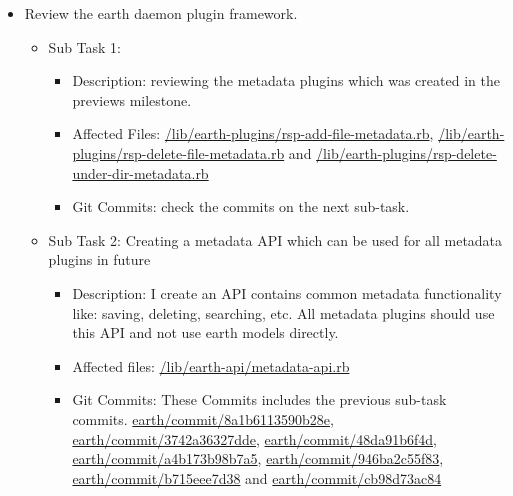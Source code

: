 \documentclass{article}
\begin{document}
\begin{itemize}
	\item Review the earth daemon plugin framework.
		\begin{itemize}
		\item Sub Task 1:
			\begin{itemize}
			\item Description: reviewing the metadata plugins which was created in the previews milestone.
			\item Affected Files: \href{http://github.com/mfbDev/earth/tree/master/lib/earth_plugins/rsp_add_file_metadata.rb}{/lib/earth-plugins/rsp-add-file-metadata.rb}, \newline
\href{http://github.com/mfbDev/earth/tree/master/lib/earth_plugins/rsp_delete_file_metadata.rb}{/lib/earth-plugins/rsp-delete-file-metadata.rb} and \newline
\href{http://github.com/mfbDev/earth/tree/master/lib/earth_plugins/rsp_delete_under_dir_metadata.rb}{/lib/earth-plugins/rsp-delete-under-dir-metadata.rb}
			\item Git Commits: check the commits on the next sub-task.
			
			\end{itemize}
		\item Sub Task 2: Creating a metadata API which can be used for all metadata plugins in future
			\begin{itemize}
			\item Description: I create an API contains common metadata functionality like: saving, deleting, searching, etc. All metadata plugins should use this API and not use earth models directly. 
			\item Affected files: \href{http://github.com/mfbDev/earth/tree/master/lib/earth_api/metadata_api.rb}{/lib/earth-api/metadata-api.rb}
			\item Git Commits: These Commits includes the previous sub-task commits. 
\href{http://github.com/mfbDev/earth/commit/8a1b6113590b28e}{earth/commit/8a1b6113590b28e}, \newline
\href{http://github.com/mfbDev/earth/commit/3742a36327dde}{earth/commit/3742a36327dde}, \newline
\href{http://github.com/mfbDev/earth/commit/48da91b6f4d}{earth/commit/48da91b6f4d}, \newline
\href{http://github.com/mfbDev/earth/commit/a4b173b98b7a5}{earth/commit/a4b173b98b7a5}, \newline
\href{http://github.com/mfbDev/earth/commit/946ba2c55f83}{earth/commit/946ba2c55f83}, \newline
\href{http://github.com/mfbDev/earth/commit/b715eee7d38}{earth/commit/b715eee7d38} and \newline
\href{http://github.com/mfbDev/earth/commit/cb98d73ac84}{earth/commit/cb98d73ac84}
			

\end{itemize}
\end{itemize}
\end{itemize}
\end{document}
